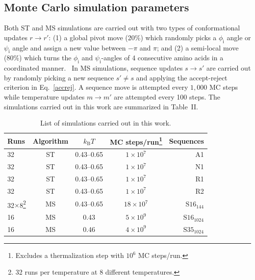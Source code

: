 \documentclass[
aip,
rsi,%
amsmath,amssymb,
reprint,%
]{revtex4-1}
\newcommand	 {\sbar}	{{s}}
\newcommand	 {\rbar}	{{r}}
\newcommand	 {\kb}		{{k_\mathrm{B}}}
\begin{document}
\subsection{Monte Carlo simulation parameters}
\noindent
Both ST and MS simulations are carried out with two types of conformational updates $\rbar\rightarrow\rbar'$: (1) a global pivot move (20\%) which randomly picks a $\phi_\mathrm{i}$ angle or $\psi_\mathrm{i}$ angle and assign a new value between $-\pi$ and $\pi$; and (2) a semi-local move (80\%) which turns the $\phi_\mathrm{i}$ and $\psi_\mathrm{i}$-angles of 4 consecutive amino acids in a coordinated manner.~\cite{Favrin2001} In MS simulations, sequence updates $\sbar\rightarrow\sbar'$ are carried out by randomly picking a new sequence $\sbar'\ne\sbar$ and applying the accept-reject criterion in Eq.~\ref{accrej}. A sequence move is attempted every $1,000$ MC steps while temperature updates $m\rightarrow m'$ are attempted every 100 steps. The simulations carried out in this work are summarized in Table~II.

\begin{table}
\caption{\label{tab2} List of simulations carried out in this work. }
\begin{ruledtabular}
\begin{tabular}{lcccr}
Runs & Algorithm & $\kb T$  & MC steps/run\footnote{Excludes a thermalization step with $10^6$ MC steps/run.} &  Sequences\\
\hline
32 & ST & 0.43--0.65 & $1\times10^7$ &A1\\ 
32 & ST & 0.43--0.65 & $1\times10^7$ &N1\\ 
32 & ST & 0.43--0.65 & $1\times10^7$ &R1\\ 
32 & ST & 0.43--0.65 & $1\times10^7$ &R2\\ 
32$\times$8\footnote{32 runs per temperature at 8 different temperatures.} & MS &0.43--0.65& $18\times 10^7$ & $\mathrm{S16}_{144}$\\
16 & MS & 0.43  & $5\times 10^9$ &  $\mathrm{S16}_{1024}$ \\
16 & MS & 0.46 & $4\times 10^9$ &  $\mathrm{S35}_{1024}$ \\
\end{tabular}
\end{ruledtabular}
\end{table}
\end{document}
